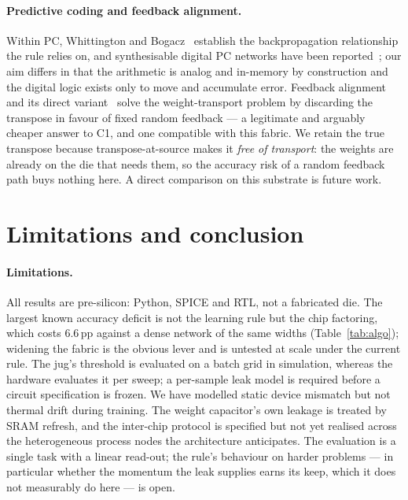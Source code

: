 \documentclass[11pt]{article}
\begin{document}
\paragraph{Predictive coding and feedback alignment.} Within PC, Whittington and
Bogacz~\cite{whittington2017approximation} establish the backpropagation relationship the rule relies
on, and synthesisable digital PC networks have been reported~\cite{oh2026synthesizable}; our aim
differs in that the arithmetic is analog and in-memory by construction and the digital logic exists
only to move and accumulate error. Feedback alignment and its direct
variant~\cite{lillicrap2016random,nokland2016direct} solve the weight-transport problem by discarding
the transpose in favour of fixed random feedback --- a legitimate and arguably cheaper answer to C1,
and one compatible with this fabric. We retain the true transpose because transpose-at-source makes it
\emph{free of transport}: the weights are already on the die that needs them, so the accuracy risk of
a random feedback path buys nothing here. A direct comparison on this substrate is future work.

\section{Limitations and conclusion}\label{sec:conclusion}

\paragraph{Limitations.} All results are pre-silicon: Python, SPICE and RTL, not a fabricated die. The
largest known accuracy deficit is not the learning rule but the chip factoring, which costs $6.6$\,pp
against a dense network of the same widths (Table~\ref{tab:algo}); widening the fabric is the obvious
lever and is untested at scale under the current rule. The jug's threshold is evaluated on a batch
grid in simulation, whereas the hardware evaluates it per sweep; a per-sample leak model is required
before a circuit specification is frozen. We have modelled static device mismatch but not thermal
drift during training. The weight capacitor's own leakage is treated by SRAM refresh, and the
inter-chip protocol is specified but not yet realised across the heterogeneous process nodes the
architecture anticipates. The evaluation is a single task with a linear read-out; the rule's behaviour
on harder problems --- in particular whether the momentum the leak supplies earns its keep, which it
does not measurably do here --- is open.
\end{document}
